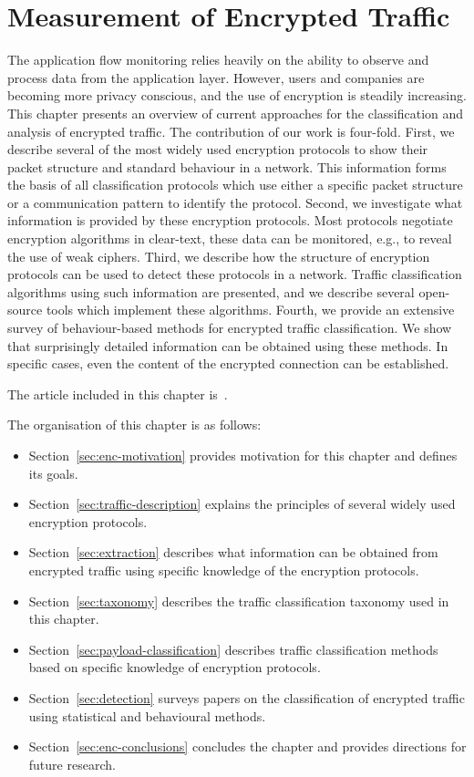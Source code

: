 \chapter{Measurement of Encrypted Traffic} \label{chap:measurement-of-encrypted-traffic}

\begin{chapintro}

The application flow monitoring relies heavily on the ability to observe and process data from the application layer. However, users and companies are becoming more privacy conscious, and the use of encryption is steadily increasing. This chapter presents an overview of current approaches for the classification and analysis of encrypted traffic. The contribution of our work is four-fold. First, we describe several of the most widely used encryption protocols to show their packet structure and standard behaviour in a network. This information forms the basis of all classification protocols which use either a specific packet structure or a communication pattern to identify the protocol. Second, we investigate what information is provided by these encryption protocols. Most protocols negotiate encryption algorithms in clear-text, these data can be monitored, e.g., to reveal the use of weak ciphers. Third, we describe how the structure of encryption protocols can be used to detect these protocols in a network. Traffic classification algorithms using such information are presented, and we describe several open-source tools which implement these algorithms. Fourth, we provide an extensive survey of behaviour-based methods for encrypted traffic classification. We show that surprisingly detailed information can be obtained using these methods. In specific cases, even the content of the encrypted connection can be established.

The article included in this chapter is~\cite{Velan-2015-Survey}.

The organisation of this chapter is as follows:
\begin{itemize}
  \item Section~\ref{sec:enc-motivation} provides motivation for this chapter and defines its goals.
  \item Section~\ref{sec:traffic-description} explains the principles of several widely used encryption protocols.
  \item Section~\ref{sec:extraction} describes what information can be obtained from encrypted traffic using specific knowledge of the encryption protocols.
  \item Section~\ref{sec:taxonomy} describes the traffic classification taxonomy used in this chapter.
  \item Section~\ref{sec:payload-classification} describes traffic classification methods based on specific knowledge of encryption protocols.
  \item Section~\ref{sec:detection} surveys papers on the classification of encrypted traffic using statistical and behavioural methods.
  \item Section~\ref{sec:enc-conclusions} concludes the chapter and provides directions for future research.
\end{itemize}


\end{chapintro}

